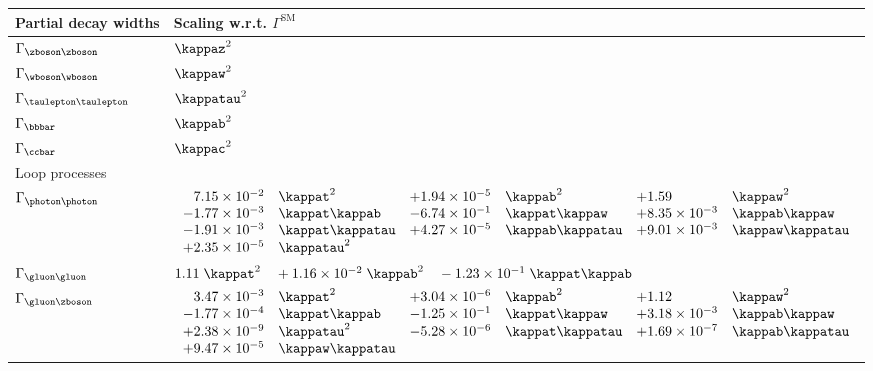 \begin{table}[htb]
    \centering
    \label{tab:decaywidths}
    \setlength{\tabcolsep}{5pt}
    \begin{tabular}{ll}
    Partial decay widths         & Scaling w.r.t. $\Gamma^\text{SM}$  \\[\tablelineskip]
    \hline
    $\Gamma_{\zboson\zboson}$       & $\kappaz^2$ \\[3pt]
    $\Gamma_{\wboson\wboson}$       & $\kappaw^2$ \\[3pt]
    $\Gamma_{\taulepton\taulepton}$ & $\kappatau^2 $ \\[3pt]
    $\Gamma_{\bbbar}$               & $\kappab^2$ \\[3pt]
    $\Gamma_{\ccbar}$               & $\kappac^2$ \\[12pt]
    Loop processes & \\[\tablelineskip]
    \hline
    $\Gamma_{\photon\photon}$       & $\begin{array}{llllll}
        \hphantom{+}7.15 \times 10^{-2}      & \kappat^2
        & + 1.94 \times 10^{-5}  & \kappab^2
        & + 1.59                 & \kappaw^2
        \\
        - 1.77 \times 10^{-3}    & \kappat\kappab
        & - 6.74 \times 10^{-1}  & \kappat\kappaw
        & + 8.35 \times 10^{-3}  & \kappab\kappaw
        \\
        - 1.91 \times 10^{-3}    & \kappat\kappatau
        & + 4.27 \times 10^{-5}  & \kappab\kappatau
        & + 9.01 \times 10^{-3}  & \kappaw\kappatau
        \\
        + 2.35 \times 10^{-5}    & \kappatau^2
        &                        &
        &                        &
        \end{array}$
    \\[24pt]
    $\Gamma_{\gluon\gluon}$        & $%
        1.11 \;\kappat^2  \quad+  1.16 \times 10^{-2} \;\kappab^2  \quad-  1.23 \times 10^{-1} \;\kappat\kappab %
        $
    \\[10pt]
    $\Gamma_{\gluon\zboson}$        & $\begin{array}{llllll}
        \hphantom{+}3.47 \times 10^{-3}  & \kappat^2
        & +3.04 \times 10^{-6} & \kappab^2
        & +1.12                & \kappaw^2
        \\
          -1.77 \times 10^{-4} & \kappat\kappab
        & -1.25 \times 10^{-1} & \kappat\kappaw
        & +3.18 \times 10^{-3} & \kappab\kappaw
        \\
          +2.38 \times 10^{-9} & \kappatau^2
        & -5.28 \times 10^{-6} & \kappat\kappatau
        & +1.69 \times 10^{-7} & \kappab\kappatau
        \\
          +9.47 \times 10^{-5} & \kappaw\kappatau
        &                      &
        &                      &
        \end{array}$
    \end{tabular}
    \end{table}
